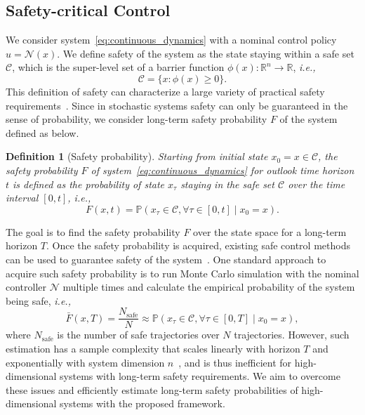 \documentclass[letterpaper]{article} %
\newcommand{\ie}{\textit{i.e., }}
\newcommand{\pr}{\mathbb{P}}
\newcommand{\safe}{\mathcal{C}}
\newtheorem{definition}[theorem]{Definition}
\begin{document}
\subsection{Safety-critical Control}
We consider system~\eqref{eq:continuous_dynamics} with a nominal control policy $u = \mathcal{N}(x)$. We define safety of the system as the state staying within a safe set $\mathcal{C}$, which is the super-level set of a barrier function $\phi(x): \mathbb{R}^n \rightarrow \mathbb{R}$, \ie 
\begin{equation}
\label{eq:safe set definition}
    \mathcal{C} = \{x : \phi(x) \geq 0\}.
\end{equation}
This definition of safety can characterize a large variety of practical safety requirements~\cite{prajna2007framework, ames2019control}. Since in stochastic systems safety can only be guaranteed in the sense of probability, we consider long-term safety probability $F$ of the system defined as below.
\begin{definition}[Safety probability]
\label{def:safety probability}
Starting from initial state $x_0 = x \in \safe$, the safety probability $F$ of system~\eqref{eq:continuous_dynamics} for outlook time horizon $t$ is defined as the probability of state $x_\tau$ staying in the safe set $\safe$ over the time interval $[0,t]$, i.e., 
\begin{equation}
    F(x,t) = \pr(x_\tau \in \safe, \forall \tau\in [0,t] \mid x_0 =x).
\end{equation}
\end{definition}
The goal is to find the safety probability $F$ over the state space for a long-term horizon $T$. Once the safety probability is acquired, existing safe control methods can be used to guarantee safety of the system~\cite{wang2021myopically,jing2022probabilistic}.
One standard approach to acquire such safety probability is to run Monte Carlo simulation with the nominal controller $\mathcal{N}$ multiple times and calculate the empirical probability of the system being safe, \ie
\begin{equation}
    \bar{F}(x,T) = \frac{N_\text{safe}}{N} \approx \pr(x_\tau \in \mathcal{C}, \forall \tau \in [0,T] \mid x_0 = x),
\end{equation}
where $N_\text{safe}$ is the number of safe trajectories over $N$ trajectories. However, such estimation has a sample complexity that scales linearly with horizon $T$ and exponentially with system dimension $n$~\cite{rubino2009rare, wang2021myopically}, and is thus inefficient for high-dimensional systems with long-term safety requirements. We aim to overcome these issues and efficiently estimate long-term safety probabilities of high-dimensional systems with the proposed framework.
\end{document}
